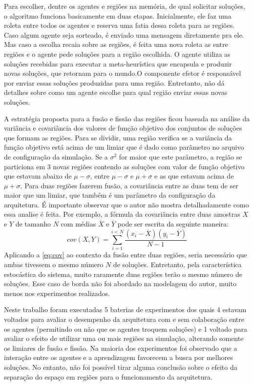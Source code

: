 Para escolher, dentre os agentes e regiões na memória, de qual solicitar soluções, o algoritmo funciona basicamente em duas etapas. Inicialmente, ele faz uma roleta entre todos os agentes e reserva uma fatia dessa roleta para as regiões. Caso algum agente seja sorteado, é enviado uma mensagem diretamente pra ele. Mas caso a escolha recaia sobre as regiões, é feita uma nova roleta as entre regiões e o agente pede soluções para a região escolhida. O agente utiliza as soluções recebidas para executar a meta-heurística que encapsula e produzir novas soluções, que retornam para o mundo.O componente efetor é responsável por enviar essas soluções produzidas para uma região. Entretanto,  não dá detalhes sobre como um agente escolhe para qual região enviar essas novas soluções. 

A estratégia proposta para a fusão e fissão das regiões ficou baseada na análise da variância e covariância dos valores de função objetivo dos conjuntos de soluções que formam as regiões. Para se dividir, uma região verifica se a variância da função objetivo está acima de um limiar que é dado como parâmetro no arquivo de configuração da simulação. Se a $\sigma^{2}$ for maior que este parâmetro, a  região se particiona em 3 novas regiões contendo as soluções com valor de função objetivo que estavam abaixo de $\mu - \sigma$, entre $\mu - \sigma$ e $\mu + \sigma$ e as que estavam acima de $\mu + \sigma$. Para duas regiões fazerem fusão, a covariância entre as duas tem de ser maior que um limiar, que também é um parâmetro da configuração da arquitetura. É importante observar que o autor não mostra detalhadamente como essa analise é feita. Por exemplo, a fórmula da covariância entre duas amostras $X$ e $Y$ de tamanho $N$ com médias $\overline{X}$ e $\overline{Y}$ pode ser escrita da seguinte maneira:
\begin{equation}
\label{eq:cov}
    cov(X,Y) = \sum_{i=1}^{i<N}\frac{(x_i - \overline{X})(y_i - \overline{Y})}{N - 1} 
\end{equation} 
Aplicando a \autoref{eq:cov} ao contexto da fusão entre duas regiões, seria necessário que ambas tivessem o mesmo número $N$ de soluções. Entretanto, pela característica estocástica do sistema, muito raramente duas regiões terão o mesmo número de soluções. Esse caso de borda não foi abordado na modelagem do autor, muito menos nos experimentos realizados. 

Neste trabalho foram executadas 5 baterias de experimentos dos quais 4 estavam voltados para avaliar o desempenho da arquitetura com e sem colaboração entre os agentes (permitindo ou não que os agentes troquem soluções) e 1 voltado para avaliar o efeito de utilizar uma ou mais regiões na simulação, alterando somente os limiares de fusão e fissão. Na maioria dos experimentos foi observado que a interação entre os agentes e a aprendizagem favorecem a busca por melhores soluções. No entanto, não foi possível tirar alguma conclusão sobre o efeito da separação do espaço em regiões para o funcionamento da arquitetura.

